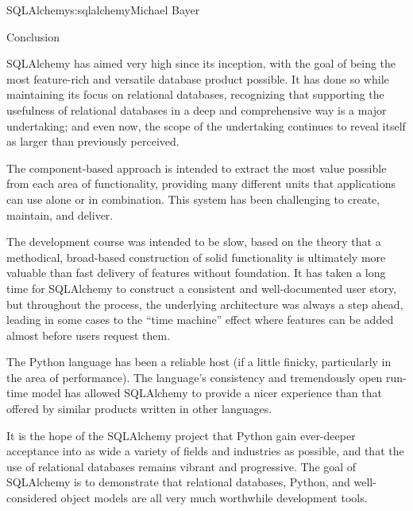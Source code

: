\begin{aosachapter}{SQLAlchemy}{s:sqlalchemy}{Michael Bayer}
\begin{aosasect1}{Conclusion}

SQLAlchemy has aimed very high since its inception, with the goal of being
the most feature-rich and versatile database product possible.  It has done
so while maintaining its focus on relational databases, recognizing that
supporting the usefulness of relational databases in a deep and comprehensive way
is a major undertaking; and even now, the scope of the undertaking
continues to reveal itself as larger than previously perceived.

The component-based
approach is intended to extract the most value possible from each area
of functionality, providing many different units that applications can use alone
or in combination.  This system has been challenging to create, maintain,
and deliver.

The development course was intended to be slow, based on the
theory that a methodical, broad-based construction of solid functionality is ultimately more valuable
than fast delivery of features without foundation.  It has taken a long time for SQLAlchemy to
construct
a consistent and well-documented user story, but throughout the process, the underlying architecture
was always a step ahead, leading in some cases to the ``time machine'' effect
where features can be added almost before users request them.

The Python language has been a reliable host (if
a little finicky, particularly in the area of performance).  The language's
consistency and tremendously open run-time model has allowed SQLAlchemy to provide a nicer
experience than that offered by similar products written in other languages.

It is the hope of the SQLAlchemy project that Python gain ever-deeper
acceptance into as wide a variety of fields and industries as possible, and
that the use of relational databases remains vibrant and progressive. The goal
of SQLAlchemy is to demonstrate that relational databases, Python, and
well-considered object models are all very much worthwhile development tools.

\end{aosasect1}

\end{aosachapter}
